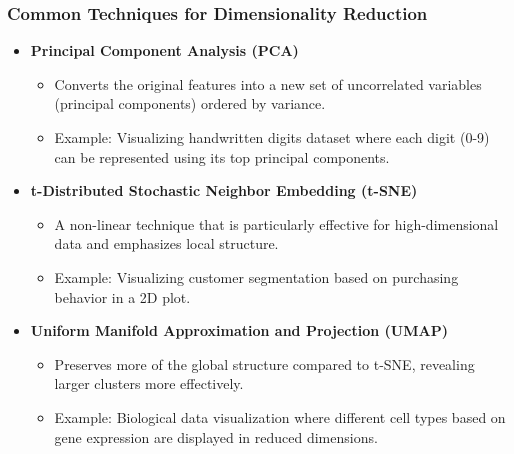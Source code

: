 \documentclass[aspectratio=169]{beamer}
\begin{document}
\begin{frame}[fragile]
    \frametitle{Common Techniques for Dimensionality Reduction}
    \begin{itemize}
        \item \textbf{Principal Component Analysis (PCA)}
            \begin{itemize}
                \item Converts the original features into a new set of uncorrelated variables (principal components) ordered by variance.
                \item Example: Visualizing handwritten digits dataset where each digit (0-9) can be represented using its top principal components.
            \end{itemize}

        \item \textbf{t-Distributed Stochastic Neighbor Embedding (t-SNE)}
            \begin{itemize}
                \item A non-linear technique that is particularly effective for high-dimensional data and emphasizes local structure.
                \item Example: Visualizing customer segmentation based on purchasing behavior in a 2D plot.
            \end{itemize}

        \item \textbf{Uniform Manifold Approximation and Projection (UMAP)}
            \begin{itemize}
                \item Preserves more of the global structure compared to t-SNE, revealing larger clusters more effectively.
                \item Example: Biological data visualization where different cell types based on gene expression are displayed in reduced dimensions.
            \end{itemize}
    \end{itemize}
\end{frame}
\end{document}
